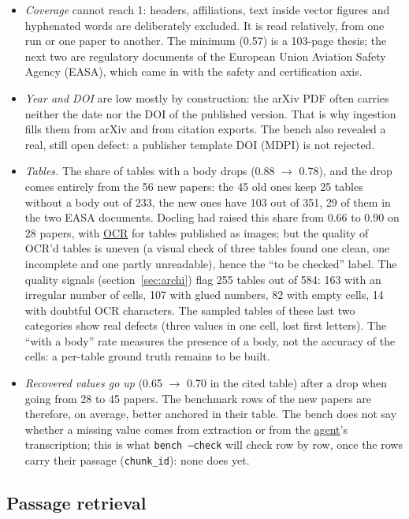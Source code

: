 \documentclass[11pt,a4paper]{article}
\newcommand{\cmd}[1]{\texttt{#1}}
\newcommand{\gl}[2]{\hyperlink{gl:#1}{\textcolor{glcolor}{#2}}}
\begin{document}
\begin{itemize}
  \item \emph{Coverage} cannot reach 1: headers, affiliations, text inside vector figures and
    hyphenated words are deliberately excluded. It is read relatively, from one run or one
    paper to another. The minimum (0.57) is a 103-page thesis; the next two are regulatory
    documents of the European Union Aviation Safety Agency (EASA), which came in with the
    safety and certification axis.
  \item \emph{Year and DOI} are low mostly by construction: the arXiv PDF often carries
    neither the date nor the DOI of the published version. That is why ingestion fills them
    from arXiv and from citation exports. The bench also revealed a real, still open defect:
    a publisher template DOI (MDPI) is not rejected.
  \item \emph{Tables.} The share of tables with a body drops (0.88 $\rightarrow$ 0.78), and
    the drop comes entirely from the 56 new papers: the 45 old ones keep 25 tables without a
    body out of 233, the new ones have 103 out of 351, 29 of them in the two EASA documents.
    Docling had raised this share from 0.66 to 0.90 on 28 papers, with \gl{OCR}{OCR} for tables published
    as images; but the quality of OCR'd tables is uneven (a visual check of three tables
    found one clean, one incomplete and one partly unreadable), hence the ``to be checked''
    label. The quality signals (section~\ref{sec:archi}) flag 255 tables out of 584: 163 with
    an irregular number of cells, 107 with glued numbers, 82 with empty cells, 14 with
    doubtful OCR characters. The sampled tables of these last two categories show real
    defects (three values in one cell, lost first letters). The ``with a body'' rate
    measures the presence of a body, not the accuracy of the cells: a per-table ground truth
    remains to be built.
  \item \emph{Recovered values go up} (0.65 $\rightarrow$ 0.70 in the cited table) after a
    drop when going from 28 to 45 papers. The benchmark rows of the new papers are therefore,
    on average, better anchored in their table. The bench does not say whether a missing
    value comes from extraction or from the \gl{agent}{agent}'s transcription; this is what
    \cmd{bench --check} will check row by row, once the rows carry their passage
    (\cmd{chunk\_id}): none does yet.
\end{itemize}

\subsection{Passage retrieval}
\label{sec:eval}
\end{document}
